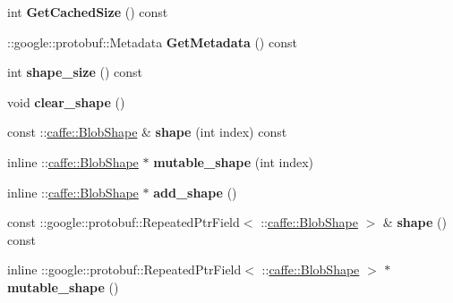 \begin{DoxyCompactItemize}
int {\bfseries Get\+Cached\+Size} () const
\item 
\mbox{\label{classcaffe_1_1_input_parameter_a5b8ac5633fae0cbbe04685a2d16e314c}} 
\+::google\+::protobuf\+::\+Metadata {\bfseries Get\+Metadata} () const
\item 
\mbox{\label{classcaffe_1_1_input_parameter_aa402fdd2a0b23c8c2f9a8300e22b4acb}} 
int {\bfseries shape\+\_\+size} () const
\item 
\mbox{\label{classcaffe_1_1_input_parameter_af93240bd27b377ea14b91f7531b5f5fa}} 
void {\bfseries clear\+\_\+shape} ()
\item 
\mbox{\label{classcaffe_1_1_input_parameter_a452f76401e4f23e1c7c0f390be12dd2e}} 
const \+::\mbox{\hyperlink{classcaffe_1_1_blob_shape}{caffe\+::\+Blob\+Shape}} \& {\bfseries shape} (int index) const
\item 
\mbox{\label{classcaffe_1_1_input_parameter_a0d259ab960c32bbbc174de3999ec450f}} 
inline \+::\mbox{\hyperlink{classcaffe_1_1_blob_shape}{caffe\+::\+Blob\+Shape}} $\ast$ {\bfseries mutable\+\_\+shape} (int index)
\item 
\mbox{\label{classcaffe_1_1_input_parameter_ab0cc471454f9f0694e55ce76db3106a6}} 
inline \+::\mbox{\hyperlink{classcaffe_1_1_blob_shape}{caffe\+::\+Blob\+Shape}} $\ast$ {\bfseries add\+\_\+shape} ()
\item 
\mbox{\label{classcaffe_1_1_input_parameter_a08ff39edf91e86f2f4c6a8aab70157b8}} 
const \+::google\+::protobuf\+::\+Repeated\+Ptr\+Field$<$ \+::\mbox{\hyperlink{classcaffe_1_1_blob_shape}{caffe\+::\+Blob\+Shape}} $>$ \& {\bfseries shape} () const
\item 
\mbox{\label{classcaffe_1_1_input_parameter_a2bca34e27a9651db942e6a5c9dae31c0}} 
inline \+::google\+::protobuf\+::\+Repeated\+Ptr\+Field$<$ \+::\mbox{\hyperlink{classcaffe_1_1_blob_shape}{caffe\+::\+Blob\+Shape}} $>$ $\ast$ {\bfseries mutable\+\_\+shape} ()
\item 
\mbox{\label{classcaffe_1_1_input_parameter_adb45760e1c8449d06f484c86c00fe50d}} 

\end{DoxyCompactItemize}
